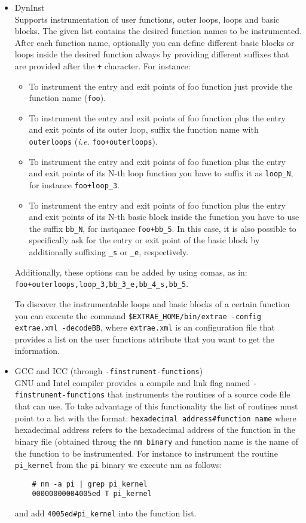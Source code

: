 \begin{itemize}

 \item DynInst\\
  Supports instrumentation of  user functions, outer loops, loops and basic blocks.
  The given list contains the desired function names to be instrumented. After each function name, optionally you can define different basic blocks or loops inside the desired function always by providing different suffixes that are provided after the {\tt +} character. For instance:\\
  \begin{itemize}
  \item To instrument the entry and exit points of foo function just provide the function name ({\tt foo}).
  \item To instrument the entry and exit points of foo function plus the entry and exit points of its outer loop, suffix the function name with {\tt outerloops} ({\em i.e.} {\tt foo+outerloops}).
  \item To instrument the entry and exit points of foo function plus the entry and exit points of its N-th loop function you have to suffix it as {\tt loop\_N}, for instance {\tt foo+loop\_3}.
  \item To instrument the entry and exit points of foo function plus the entry and exit points of its N-th basic block inside the function you have to use the suffix {\tt bb\_N}, for instqance {\tt foo+bb\_5}. In this case, it is also possible to specifically ask for the entry or exit point of the basic block by additionally suffixing {\tt \_s} or {\tt \_e}, respectively.
  \end{itemize}
  Additionally, these options can be added by using comas, as in:\\
  {\tt foo+outerloops,loop\_3,bb\_3\_e,bb\_4\_s,bb\_5}.

  To discover the instrumentable loops and basic blocks of a certain function you can execute the command {\tt \${EXTRAE\_HOME}/bin/extrae -config extrae.xml -decodeBB}, where {\tt extrae.xml} is an \TRACE configuration file that provides a list on the user functions attribute that you want to get the information.
  \item GCC and ICC (through {\tt -finstrument-functions})\\
  GNU and Intel compiler provides a compile and link flag named {\tt -finstrument-functions} that instruments the routines of a source code file that \TRACE can use. To take advantage of this functionality the list of routines must point to a list with the format:
	{\tt hexadecimal address\#function name}
  where hexadecimal address refers to the hexadecimal address of the function in the binary file (obtained throug the {\tt nm binary} and function name is the name of the function to be instrumented. For instance to instrument the routine {\tt pi\_kernel} from the {\tt pi} binary we execute nm as follows:
  \begin{verbatim}
    # nm -a pi | grep pi_kernel
    00000000004005ed T pi_kernel
  \end{verbatim}
  and add {\tt 4005ed\#pi\_kernel} into the function list.
\end{itemize}

